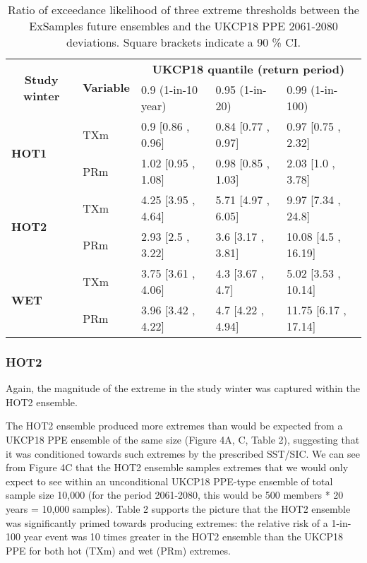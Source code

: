       \begin{table}[h]
        \centering
        \footnotesize
        \begin{tabular}{lllll}
          \toprule
          \multicolumn{1}{c}{\multirow{2}{*}{\textbf{Study winter}}}&\multicolumn{1}{c}{\multirow{2}{*}{\textbf{Variable}}}&\multicolumn{3}{c}{\textbf{UKCP18 quantile (return period)}}\\\cmidrule(lr){3-5}
          \multicolumn{1}{c}{}&\multicolumn{1}{c}{}&\multicolumn{1}{l}{0.9 (1-in-10 year)}&\multicolumn{1}{l}{0.95 (1-in-20)}&0.99 (1-in-100)\\\midrule
          \multirow{2}{*}{\textbf{HOT1}}&TXm&\multicolumn{1}{l}{0.9 {[}0.86 , 0.96{]}}&\multicolumn{1}{l}{0.84 {[}0.77 , 0.97{]}}&0.97 {[}0.75 , 2.32{]}\\
          &PRm&\multicolumn{1}{l}{1.02 {[}0.95 , 1.08{]}}&\multicolumn{1}{l}{0.98 {[}0.85 , 1.03{]}}&2.03 {[}1.0 , 3.78{]}\\\midrule
          \multirow{2}{*}{\textbf{HOT2}}&TXm&\multicolumn{1}{l}{4.25 {[}3.95 , 4.64{]}}&\multicolumn{1}{l}{5.71 {[}4.97 , 6.05{]}}&9.97 {[}7.34 , 24.8{]}\\
          &PRm&\multicolumn{1}{l}{2.93 {[}2.5 , 3.22{]}}&\multicolumn{1}{l}{3.6 {[}3.17 , 3.81{]}}&10.08 {[}4.5 , 16.19{]}\\\midrule
          \multirow{2}{*}{\textbf{WET}}&TXm&\multicolumn{1}{l}{3.75 {[}3.61 , 4.06{]}}&\multicolumn{1}{l}{4.3 {[}3.67 , 4.7{]}}&5.02 {[}3.53 , 10.14{]}\\
          &PRm&\multicolumn{1}{l}{3.96 {[}3.42 , 4.22{]}}&\multicolumn{1}{l}{4.7 {[}4.22 , 4.94{]}}&11.75 {[}6.17 , 17.14{]}\\\bottomrule
          \end{tabular}
        \caption{Ratio of exceedance likelihood of three extreme thresholds between the ExSamples future ensembles and the UKCP18 PPE 2061-2080 deviations. Square brackets indicate a 90 \% CI.}
      \end{table}
      \clearpage

    \subsubsection{HOT2}

      Again, the magnitude of the extreme in the study winter was captured within the HOT2 ensemble.
      
      The HOT2 ensemble produced more extremes than would be expected from a UKCP18 PPE ensemble of the same size (Figure 4A, C, Table 2), suggesting that it was conditioned towards such extremes by the prescribed SST/SIC. We can see from Figure 4C that the HOT2 ensemble samples extremes that we would only expect to see within an unconditional UKCP18 PPE-type ensemble of total sample size 10,000 (for the period 2061-2080, this would be 500 members * 20 years = 10,000 samples). Table 2 supports the picture that the HOT2 ensemble was significantly primed towards producing extremes: the relative risk of a 1-in-100 year event was 10 times greater in the HOT2 ensemble than the UKCP18 PPE for both hot (TXm) and wet (PRm) extremes.
      
